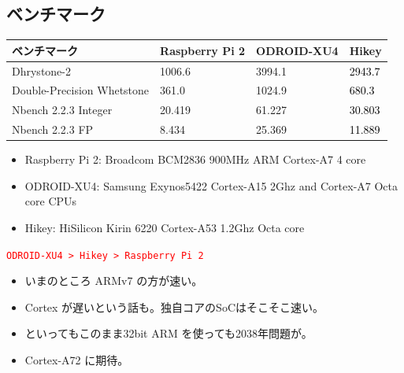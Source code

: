 \documentclass[mingoth,a4paper]{jsarticle}
\begin{document}
  \subsection{ベンチマーク}

\begin{table}[htb]
  \begin{tabular}{|l|l|l||l|} \hline
    ベンチマーク  & Raspberry Pi 2 & ODROID-XU4 & Hikey  \\ \hline \hline
    Dhrystone-2 & 1006.6 & 3994.1 & \textcolor{black}{2943.7} \\ \hline
    Double-Precision Whetstone & 361.0 & 1024.9 & \textcolor{black}{680.3} \\ \hline
    Nbench 2.2.3 Integer  & 20.419 & 61.227  & \textcolor{black}{30.803} \\ \hline
    Nbench 2.2.3 FP  & 8.434 & 25.369 & \textcolor{black}{11.889} \\ \hline
  \end{tabular}
\end{table}

\begin{itemize}
\item Raspberry Pi 2: Broadcom BCM2836 900MHz  ARM Cortex-A7 4 core
\item ODROID-XU4: Samsung Exynos5422 Cortex-A15 2Ghz and Cortex-A7 Octa core CPUs
\item Hikey: HiSilicon Kirin 6220 Cortex-A53 1.2Ghz Octa core
\end{itemize}

 \begin{center}
 \textcolor{red}{\texttt{ODROID-XU4 > Hikey > Raspberry Pi 2}}
 \end{center}



%
%


  \begin{itemize}
  \item いまのところ ARMv7 の方が速い。
  \item Cortex が遅いという話も。独自コアのSoCはそこそこ速い。
  \item といってもこのまま32bit ARM を使っても2038年問題が。
  \item Cortex-A72 に期待。
  \end{itemize}
\end{document}
